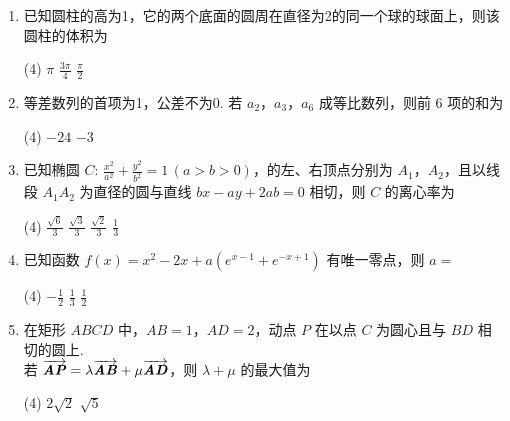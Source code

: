 \documentclass[11pt,space]{ctexart}
\begin{document}
\begin{enumerate}[itemsep=0.2em,topsep=0pt]
	\item 已知圆柱的高为1，它的两个底面的圆周在直径为2的同一个球的球面上，则该圆柱的体积为
	\begin{tasks}(4)
		\task $\pi$ \task $\frac{3\pi}{4}$ \task $\frac{\pi}{2}$  
	\end{tasks}
	\item 等差数列的首项为1，公差不为0. 若 $a_2$，$a_3$，$a_6$ 成等比数列，则前 6 项的和为
	\begin{tasks}(4)
		\task $-24$ \task $-3$   
	\end{tasks}
	\item 已知椭圆 $C\colon\,\tfrac{x^2}{a^2}+\tfrac{y^2}{b^2}=1\,(a>b>0)$，的左、右顶点分别为 $A_1$，$A_2$，且以线段 $A_1A_2$ 为直径的圆与直线 $bx-ay+2ab=0$ 相切，则 $C$ 的离心率为
	\begin{tasks}(4)
		\task $\frac{\sqrt{6}}{3}$ \task $\frac{\sqrt{3}}{3}$ \task $\frac{\sqrt{2}}{3}$ \task $\frac{1}{3}$ 
	\end{tasks}
	\item 已知函数 $f(x)=x^2-2x+a(e^{x-1}+e^{-x+1})$ 有唯一零点，则 $a=$
	\begin{tasks}(4)
		\task $-\frac{1}{2}$ \task $\frac{1}{3}$ \task $\frac{1}{2}$  
	\end{tasks}
	\item 在矩形 $ABCD$ 中，$AB=1$，$AD=2$，动点 $P$ 在以点 $C$ 为圆心且与 $BD$ 相切的圆上.\\
	若 $\overrightarrow{\textbf{\textit{AP}}}=\lambda\overrightarrow{\textbf{\textit{AB}} }+\mu\overrightarrow{\textbf{\textit{AD}}}$，则 $\lambda+\mu$ 的最大值为
	\begin{tasks}(4)
		 \task $2\sqrt{2}$ \task $\sqrt{5}$  
	\end{tasks}
\end{enumerate}
\end{document}
